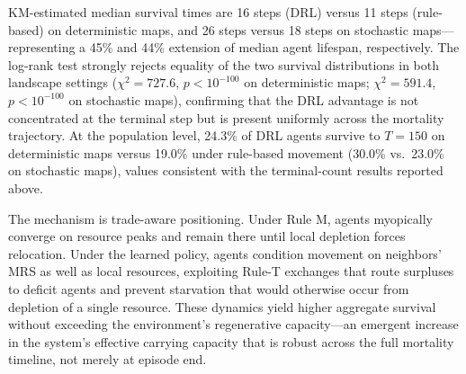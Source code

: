 \documentclass[pdflatex,sn-mathphys-num]{sn-jnl}%
\theoremstyle{thmstyleone}%
\theoremstyle{thmstyletwo}%
\theoremstyle{thmstylethree}%
\begin{document}
KM-estimated median survival times are 16 steps (DRL) versus 11 steps (rule-based) on deterministic maps, and 26 steps versus 18 steps on stochastic maps---representing a 45\% and 44\% extension of median agent lifespan, respectively.
The log-rank test strongly rejects equality of the two survival distributions in both landscape settings ($\chi^2 = 727.6$, $p < 10^{-100}$ on deterministic maps; $\chi^2 = 591.4$, $p < 10^{-100}$ on stochastic maps), confirming that the DRL advantage is not concentrated at the terminal step but is present uniformly across the mortality trajectory.
At the population level, 24.3\% of DRL agents survive to $T = 150$ on deterministic maps versus 19.0\% under rule-based movement (30.0\% vs.\ 23.0\% on stochastic maps), values consistent with the terminal-count results reported above.

The mechanism is trade-aware positioning.
Under Rule M, agents myopically converge on resource peaks and remain there until local depletion forces relocation.
Under the learned policy, agents condition movement on neighbors' MRS as well as local resources, exploiting Rule-T exchanges that route surpluses to deficit agents and prevent starvation that would otherwise occur from depletion of a single resource.
These dynamics yield higher aggregate survival without exceeding the environment's regenerative capacity---an emergent increase in the system's effective carrying capacity that is robust across the full mortality timeline, not merely at episode end.
\end{document}
